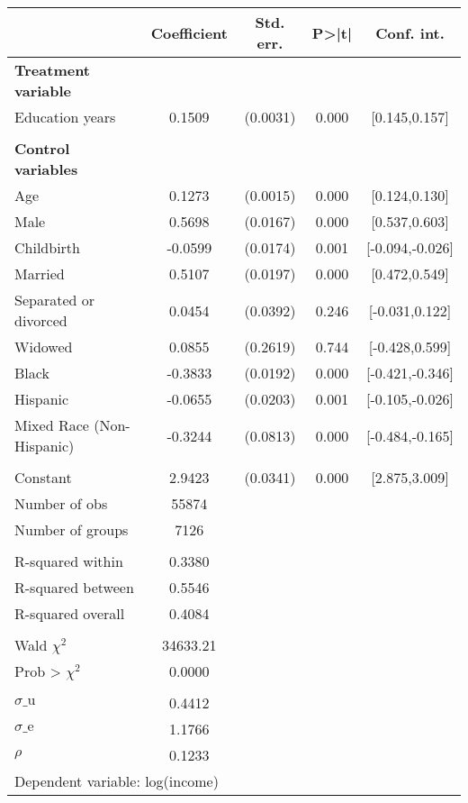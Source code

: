 {
\def\sym#1{\ifmmode^{#1}\else\(^{#1}\)\fi}
\begin{tabular}{l*{1}{cccc}}
\toprule
                    & Coefficient&   Std. err.&       P>|t|&  Conf. int.\\
\midrule
\textbf{Treatment variable}&            &            &            &            \\
Education years     &      0.1509&    (0.0031)&       0.000&[0.145,0.157]\\
\\ \textbf{Control variables}&            &            &            &            \\
Age                 &      0.1273&    (0.0015)&       0.000&[0.124,0.130]\\
Male                &      0.5698&    (0.0167)&       0.000&[0.537,0.603]\\
Childbirth          &     -0.0599&    (0.0174)&       0.001&[-0.094,-0.026]\\
Married             &      0.5107&    (0.0197)&       0.000&[0.472,0.549]\\
Separated or divorced&      0.0454&    (0.0392)&       0.246&[-0.031,0.122]\\
Widowed             &      0.0855&    (0.2619)&       0.744&[-0.428,0.599]\\
Black               &     -0.3833&    (0.0192)&       0.000&[-0.421,-0.346]\\
Hispanic            &     -0.0655&    (0.0203)&       0.001&[-0.105,-0.026]\\
Mixed Race (Non-Hispanic)&     -0.3244&    (0.0813)&       0.000&[-0.484,-0.165]\\
                    &            &            &            &            \\
Constant            &      2.9423&    (0.0341)&       0.000&[2.875,3.009]\\
\midrule
Number of obs       &       55874&            &            &            \\
Number of groups    &        7126&            &            &            \\
\\ R-squared within &      0.3380&            &            &            \\
R-squared between   &      0.5546&            &            &            \\
R-squared overall   &      0.4084&            &            &            \\
\\ Wald $\chi^2$    &    34633.21&            &            &            \\
Prob > $\chi^2$     &      0.0000&            &            &            \\
\\ $\sigma\text{\_u}$&      0.4412&            &            &            \\
$\sigma\text{\_e}$   &      1.1766&            &            &            \\
$\rho$              &      0.1233&            &            &            \\
\bottomrule
\multicolumn{5}{l}{\footnotesize Dependent variable: log(income)}\\
\end{tabular}
}

